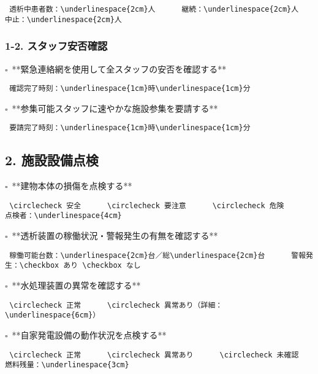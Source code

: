 \documentclass[
  japanese,
]{jarticle}
\newcommand{\checkbox}{$\square$\ }
\newcommand{\underlinespace}[1]{\underline{\hspace{#1}}}
\newcommand{\circlecheck}{$\bigcirc$\ }
\begin{document}
\begin{verbatim}
 透析中患者数：\underlinespace{2cm}人      継続：\underlinespace{2cm}人      中止：\underlinespace{2cm}人
\end{verbatim}

\subsubsection{1-2.
スタッフ安否確認}\label{ux30b9ux30bfux30c3ux30d5ux5b89ux5426ux78baux8a8d}

\checkbox **緊急連絡網を使用して全スタッフの安否を確認する**

\begin{verbatim}
 確認完了時刻：\underlinespace{1cm}時\underlinespace{1cm}分
\end{verbatim}

\checkbox **参集可能スタッフに速やかな施設参集を要請する**

\begin{verbatim}
 要請完了時刻：\underlinespace{1cm}時\underlinespace{1cm}分
\end{verbatim}

\subsection{2. 施設設備点検}\label{ux65bdux8a2dux8a2dux5099ux70b9ux691c}

\checkbox **建物本体の損傷を点検する**

\begin{verbatim}
 \circlecheck 安全      \circlecheck 要注意      \circlecheck 危険      点検者：\underlinespace{4cm}
\end{verbatim}

\checkbox **透析装置の稼働状況・警報発生の有無を確認する**

\begin{verbatim}
 稼働可能台数：\underlinespace{2cm}台／総\underlinespace{2cm}台      警報発生：\checkbox あり \checkbox なし
\end{verbatim}

\checkbox **水処理装置の異常を確認する**

\begin{verbatim}
 \circlecheck 正常      \circlecheck 異常あり（詳細：\underlinespace{6cm}）
\end{verbatim}

\checkbox **自家発電設備の動作状況を点検する**

\begin{verbatim}
 \circlecheck 正常      \circlecheck 異常あり      \circlecheck 未確認      燃料残量：\underlinespace{3cm}
\end{verbatim}
\end{document}

